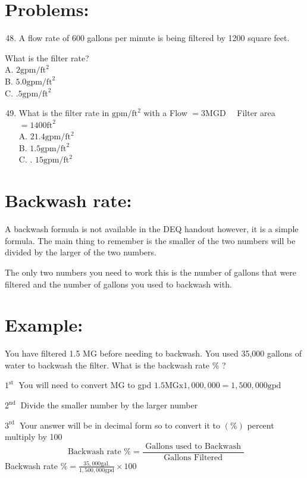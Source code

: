 \documentclass[10pt]{article}
\begin{document}
\section{Problems:}
\begin{enumerate}
  \setcounter{enumi}{47}
  \item A flow rate of 600 gallons per minute is being filtered by 1200 square feet.
\end{enumerate}
What is the filter rate?\\
A. $2 \mathrm{gpm} / \mathrm{ft}^{2}$\\
B. $5.0 \mathrm{gpm} / \mathrm{ft}^{2}$\\
C. $.5 \mathrm{gpm} / \mathrm{ft}^{2}$

\begin{enumerate}
  \setcounter{enumi}{48}
  \item What is the filter rate in $\mathrm{gpm} / \mathrm{ft}^{2}$ with a Flow $=3 \mathrm{MGD} \quad$ Filter area $=1400 \mathrm{ft}^{2}$\\
A. $21.4 \mathrm{gpm} / \mathrm{ft}^{2}$\\
B. $1.5 \mathrm{gpm} / \mathrm{ft}^{2}$\\
C. . $15 \mathrm{gpm} / \mathrm{ft}^{2}$
\end{enumerate}
\section{Backwash rate:}
A backwash formula is not available in the DEQ handout however, it is a simple formula. The main thing to remember is the smaller of the two numbers will be divided by the larger of the two numbers.

The only two numbers you need to work this is the number of gallons that were filtered and the number of gallons you used to backwash with.

\section{Example:}
You have filtered 1.5 MG before needing to backwash. You used 35,000 gallons of water to backwash the filter. What is the backwash rate $\%$ ?

$1^{\text {st }}$ You will need to convert $\mathrm{MG}$ to gpd $1.5 \mathrm{MGx} 1,000,000=1,500,000 \mathrm{gpd}$

$2^{\text {nd }}$ Divide the smaller number by the larger number

$3^{\text {rd }}$ Your answer will be in decimal form so to convert it to $(\%)$ percent multiply by 100
$$
\text { Backwash rate } \%=\frac{\text { Gallons used to Backwash }}{\text { Gallons Filtered }}
$$
Backwash rate $\%=\frac{35,000 \mathrm{gal} .}{1,500,000 \mathrm{gpd}} \times 100$
\end{document}
